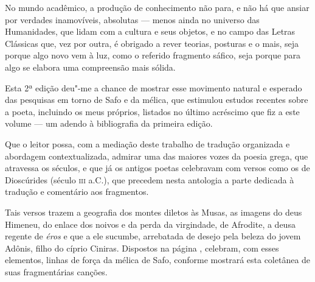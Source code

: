 No mundo acadêmico, a produção de conhecimento não para, e não há que
ansiar por verdades inamovíveis, absolutas --- menos ainda no universo
das Humanidades, que lidam com a cultura e seus objetos,
e no campo das Letras Clássicas que, vez por outra, é obrigado a rever
teorias, posturas e o mais, seja porque algo novo vem à luz, como o 
referido fragmento sáfico, seja porque para algo se elabora uma compreensão mais
sólida.

Esta 2ª edição deu"-me a chance de mostrar esse movimento natural e
esperado das pesquisas em torno de Safo e da mélica, que estimulou
estudos recentes sobre a poeta, incluindo os meus próprios, listados no
último acréscimo que fiz a este volume --- um adendo à bibliografia
da primeira edição.

Que o leitor possa, com a mediação deste trabalho de tradução organizada
e abordagem contextualizada, admirar uma das maiores vozes da poesia grega, que
atravessa os séculos, e que já os antigos poetas celebravam com versos
como os de Dioscúrides (século \textsc{iii} a.C.), que precedem nesta antologia 
a parte dedicada à tradução e comentário aos fragmentos.


Tais versos trazem a geografia dos montes diletos às Musas,
as imagens do deus Himeneu, do enlace dos noivos e da 
perda da virgindade, de Afrodite, a deusa regente de \emph{éros} e 
que a ele sucumbe, arrebatada de desejo pela beleza do 
jovem Adônis, filho do cíprio Ciniras. Dispostos na página 
\pageref{dioscurides}, celebram, com esses elementos, linhas de força da 
mélica de Safo, conforme mostrará esta coletânea de suas 
fragmentárias canções.


